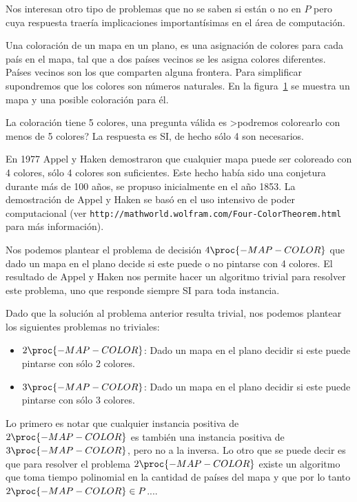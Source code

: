 Nos interesan otro tipo de problemas que no se saben si están o no en $P$ pero cuya respuesta traería implicaciones importantísimas en el área de computación.

\begin{ejemplo}
Una coloración de un mapa en un plano, es una asignación de colores para cada país en el mapa, tal que a dos países vecinos se les asigna colores diferentes.
Países vecinos son los que comparten alguna frontera.
Para simplificar supondremos que los colores son números naturales.
En la figura~\ref{fig:map1} se muestra un mapa y una posible coloración para él.
\begin{figure}[h!]
\vspace*{200pt}
\caption{}
\label{fig:map1}
\end{figure}
La coloración tiene 5 colores, una pregunta válida es >podremos colorearlo con menos de 5 colores?
La respuesta es SI, de hecho sólo 4 son necesarios.

En 1977 Appel y Haken demostraron que cualquier mapa puede ser coloreado con 4 colores, sólo 4 colores son suficientes.
Este hecho había sido una conjetura durante más de 100 años, se propuso inicialmente en el año 1853.
La demostración de Appel y Haken se basó en el uso intensivo de poder computacional (ver \verb|http://mathworld.wolfram.com/Four-ColorTheorem.html| para más información).

Nos podemos plantear el problema de decisión $4\proc{-MAP-COLOR}$ que dado un mapa en el plano decide si este puede o no pintarse con 4 colores.
El resultado de Appel y Haken nos permite hacer un algoritmo trivial para resolver este problema, uno que responde siempre SI para toda instancia.

Dado que la solución al problema anterior resulta trivial, nos podemos plantear los siguientes problemas no triviales:
\begin{itemize}
  \itemsep 0pt
  \item $2\proc{-MAP-COLOR}$: Dado un mapa en el plano decidir si este puede pintarse con sólo 2 colores.
  \item $3\proc{-MAP-COLOR}$: Dado un mapa en el plano decidir si este puede pintarse con sólo 3 colores.
\end{itemize}
Lo primero es notar que cualquier instancia positiva de $2\proc{-MAP-COLOR}$ es también una instancia positiva de $3\proc{-MAP-COLOR}$, pero no a la inversa.
Lo otro que se puede decir es que para resolver el problema $2\proc{-MAP-COLOR}$ existe un algoritmo que toma tiempo polinomial en la cantidad de países del mapa y que por lo tanto $2\proc{-MAP-COLOR}\in P$....


\end{ejemplo}
